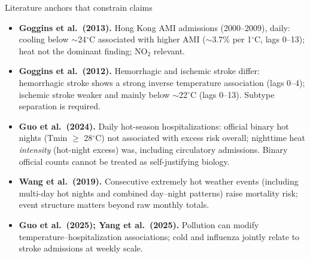 \documentclass[aspectratio=169,10pt]{beamer}
\begin{document}
\begin{frame}{Literature anchors that constrain claims}
  \footnotesize
  \begin{itemize}
    \item \textbf{Goggins et al.\ (2013).} Hong Kong AMI admissions (2000--2009), daily: cooling below $\sim$24$^\circ$C associated with higher AMI ($\sim$3.7\% per 1$^\circ$C, lags 0--13); heat not the dominant finding; NO$_2$ relevant.
    \item \textbf{Goggins et al.\ (2012).} Hemorrhagic and ischemic stroke differ: hemorrhagic stroke shows a strong inverse temperature association (lags 0--4); ischemic stroke weaker and mainly below $\sim$22$^\circ$C (lags 0--13). Subtype separation is required.
    \item \textbf{Guo et al.\ (2024).} Daily hot-season hospitalizations: official binary hot nights (Tmin $\ge$ 28$^\circ$C) not associated with excess risk overall; nighttime heat \emph{intensity} (hot-night excess) was, including circulatory admissions. Binary official counts cannot be treated as self-justifying biology.
    \item \textbf{Wang et al.\ (2019).} Consecutive extremely hot weather events (including multi-day hot nights and combined day--night patterns) raise mortality risk; event structure matters beyond raw monthly totals.
    \item \textbf{Guo et al.\ (2025); Yang et al.\ (2025).} Pollution can modify temperature--hospitalization associations; cold and influenza jointly relate to stroke admissions at weekly scale.
  \end{itemize}
\end{frame}
\end{document}
